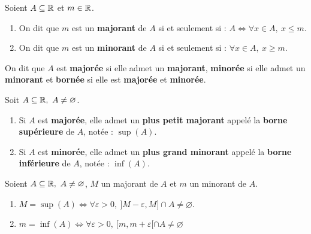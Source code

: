 \begin{definition}
    Soient $A \subseteq \mathbb{R}$ et $m \in \mathbb{R}$.
    \begin{enumerate}
        \item On dit que $m$ est un \textbf{majorant} de $A$ si et seulement si : $A \iff \forall x \in A,\ x \leq m$.
        \item On dit que $m$ est un \textbf{minorant} de $A$ si et seulement si : $\forall x \in A,\ x \geq m$.
    \end{enumerate}
    On dit que $A$ est \textbf{majorée} si elle admet un \textbf{majorant}, \textbf{minorée} si elle admet un \textbf{minorant} et \textbf{bornée} si elle est \textbf{majorée} et \textbf{minorée}.
\end{definition}

\begin{theorem}
    Soit $A \subseteq \mathbb{R},\ A \neq \varnothing$. 
    \begin{enumerate}
    	\item Si $A$ est \textbf{majorée}, elle admet un \textbf{plus petit majorant} appelé la \textbf{borne supérieure} de $A$, notée : $\sup(A)$.
    	\item Si $A$ est \textbf{minorée}, elle admet un \textbf{plus grand minorant} appelé la \textbf{borne inférieure} de $A$, notée : $\inf(A)$.
    \end{enumerate}
\end{theorem}

\begin{proposition}
    Soient $A \subseteq \mathbb{R},\ A \neq \varnothing$, $M$ un majorant de $A$ et $m$ un minorant de $A$.  
    \begin{enumerate}
        \item $M = \sup(A) \iff \forall \varepsilon > 0,\ ]M - \varepsilon, M] \cap A \neq \varnothing$.
        \item $m = \inf(A) \iff \forall \varepsilon > 0,\ [m, m + \varepsilon[ \cap A \neq \varnothing $
    \end{enumerate}
\end{proposition}